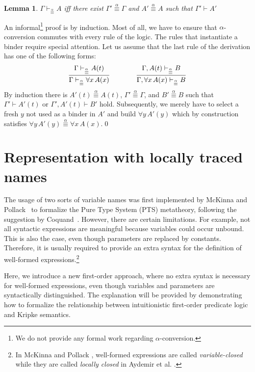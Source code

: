 \documentclass{svjour3}                     %
\newtheorem{lem}[thm]{Lemma}
\newcommand{\seq}[2]{\infer{#2}{#1}}
\newcommand{\al}{\alpha}
\begin{document}
\begin{lem}
$\Gamma \vdash_{\stackrel{\alpha}{\equiv}} A$ iff there exist
  $\Gamma' \stackrel{\alpha}{\equiv} \Gamma$ and $A'
  \stackrel{\alpha}{\equiv} A$ such that $\Gamma' \vdash A'$
\end{lem}

An informal\footnote{We do not provide any formal work regarding
  $\al$-conversion.} proof is by induction.  Most of all, we  have to
ensure that  
$\alpha$-conversion commutes with every rule of the logic. The rules
that instantiate a binder require special attention. Let us
assume that the last rule of the derivation has one of the following forms:
\[
\seq{\Gamma \vdash_{\stackrel{\alpha}{\equiv}} A(t)}
    {\Gamma \vdash_{\stackrel{\alpha}{\equiv}} \forall x\, A(x)}
\qquad\qquad
\seq{\Gamma, A(t) \vdash_{\stackrel{\alpha}{\equiv}} B}
    {\Gamma, \forall x\, A(x) \vdash_{\stackrel{\alpha}{\equiv}} B}
\]
By induction there is $A'(t) \stackrel{\alpha}{\equiv} A(t)$,
$\Gamma' \stackrel{\alpha}{\equiv} \Gamma$, and $B' \stackrel{\alpha}{\equiv} B$
such that
$\Gamma' \vdash A'(t)$ or $\Gamma', A'(t) \vdash B'$
hold.
Subsequently, we merely have to select a fresh $y$ not used as a binder in $A'$ and build
$\forall y\, A'(y)$
which by construction satisfies
$\forall y\, A'(y) \stackrel{\alpha}{\equiv} \forall x\, A(x)$.\qed

\section{Representation with locally traced names}\label{sec:locally}
The usage of two sorts of variable names was first implemented by
McKinna and Pollack~\cite{mcpol93,mcpol99} to formalize the Pure Type
System (PTS) metatheory, following the suggestion by
Coquand~\cite{Coquand91}. However, there are certain limitations. For
example, not
all syntactic expressions are meaningful because variables could occur
unbound. This is also the case, even though parameters are replaced by
constants. Therefore, it is usually required to provide an extra syntax
for the definition of well-formed expressions.\footnote{In McKinna and
  Pollack \cite{mcpol93,mcpol99}, well-formed expressions are called
  \textit{variable-closed} while they are called \textit{locally closed} in Aydemir et al. \cite{engineering}.}

Here, we introduce a new first-order approach, where no extra syntax is
necessary for well-formed expressions, even though variables and
parameters are syntactically distinguished. The explanation will be
provided by demonstrating how to formalize the relationship between
intuitionistic first-order predicate logic and Kripke semantics.
\end{document}
